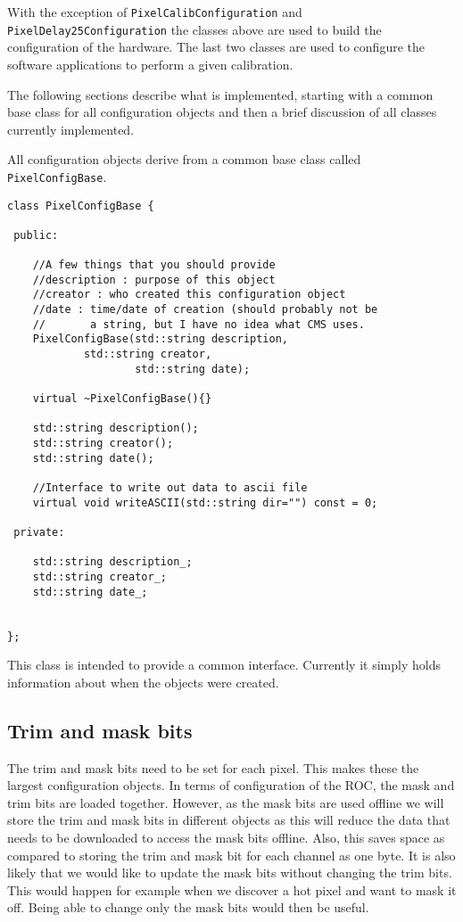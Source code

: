 \vskip 0.5cm


With the exception of {\tt PixelCalibConfiguration} and 
{\tt PixelDelay25Configuration} the classes above are used to build the
configuration of the hardware. The last two classes are used to 
configure the software applications to perform a given 
calibration.


The following sections describe what is implemented, starting with
a common base class for all configuration objects and then a
brief discussion of all classes currently implemented.

All configuration objects derive from a common base class called
{\tt PixelConfigBase}.

\begin{verbatim}
class PixelConfigBase {

 public:

    //A few things that you should provide
    //description : purpose of this object
    //creator : who created this configuration object
    //date : time/date of creation (should probably not be
    //       a string, but I have no idea what CMS uses.
    PixelConfigBase(std::string description,
		    std::string creator,
                    std::string date);

    virtual ~PixelConfigBase(){}

    std::string description();
    std::string creator();
    std::string date();

    //Interface to write out data to ascii file
    virtual void writeASCII(std::string dir="") const = 0;

 private:

    std::string description_;
    std::string creator_;
    std::string date_;
     

};
\end{verbatim}

This class is intended to provide a common interface. Currently it simply
holds information about when the objects were created. 


\subsection{Trim and mask bits}

The trim and mask bits need to be set for each pixel. This
makes these the largest configuration objects. In terms
of configuration of the ROC, the mask and trim bits are loaded
together. However, as the mask bits are used offline we will
store the trim and mask bits in different objects 
as this will reduce the data that needs to be downloaded
to access the mask bits offline. Also, this saves space
as compared to storing the trim and mask bit for each 
channel as one byte. It is also likely that we would
like to update the mask bits without changing the trim bits.
This would happen for example when we discover a hot pixel
and want to mask it off. Being able to change only the
mask bits would then be useful.

